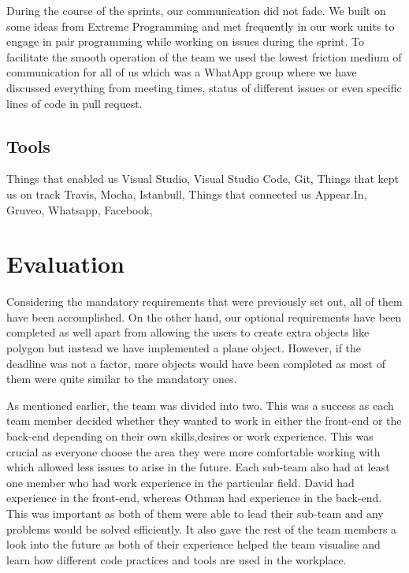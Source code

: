 \documentclass[a4paper]{report}
\begin{document}
	During the course of the sprints, our communication did not fade. We built on some ideas from Extreme Programming and met frequently in our work units to engage in pair programming while working on issues during the sprint. To facilitate the smooth operation of the team we used the lowest friction medium of communication for all of us which was a WhatApp group where we have discussed everything from meeting times, status of different issues or even specific lines of code in pull request. 
	
	\section{Tools}
	
	Things that enabled us
	Visual Studio, Visual Studio Code, Git,
	Things that kept us on track
	Travis, Mocha, Istanbull,
	Things that connected us
	Appear.In, Gruveo, Whatsapp, Facebook,
	
	
	\chapter{Evaluation}
	Considering the mandatory requirements that were previously set out, all of them have been accomplished.
	On the other hand, our optional requirements have been
	completed as well apart from allowing the users to create extra objects like polygon but instead we have implemented a plane object. However, if the deadline was not a factor, more objects would have been completed as most of them were quite similar to the mandatory ones. 
	
	As mentioned earlier, the team was divided into two. This was a success as each team member decided whether they wanted to work in either the front-end or the back-end depending on their own skills,desires or work experience. This was crucial as everyone choose the area they were more comfortable working with which allowed less issues to arise in the future. Each sub-team also had at least one member who had work experience in the particular field. David had experience in the front-end, whereas Othman had experience in the back-end. This was important as both of them were able to lead their sub-team and any problems would be solved efficiently. It also gave the rest of the team members a look into the future as both of their experience helped the team visualise and learn how different code practices and tools are used in the workplace.
	
\end{document}
